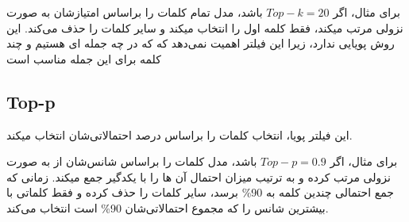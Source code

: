 \documentclass{article}
\begin{document}
برای مثال، اگر $Top-k=20$ باشد، مدل تمام کلمات را براساس امتیازشان به صورت نزولی مرتب میکند، فقط  کلمه اول را انتخاب میکند و سایر کلمات را حذف می‌کند. این روش پویایی ندارد، زیرا این فیلتر اهمیت نمی‌دهد که که در چه جمله ای هستیم و چند کلمه برای این جمله مناسب است
\subsection{Top-p}
این فیلتر پویا، انتخاب کلمات را براساس درصد احتمالاتی‌شان انتخاب میکند.

برای مثال، اگر $Top-p = 0.9$ باشد، مدل کلمات را براساس شانس‌شان از به صورت نزولی مرتب کرده و به ترتیب میزان احتمال آن ها را با یکدگیر جمع میکند. زمانی که جمع احتمالی چندین کلمه به 90\% برسد، سایر کلمات را حذف کرده و فقط کلماتی با بیشترین شانس را که مجموع احتمالاتی‌شان 90\% است انتخاب می‌کند.
\end{document}
